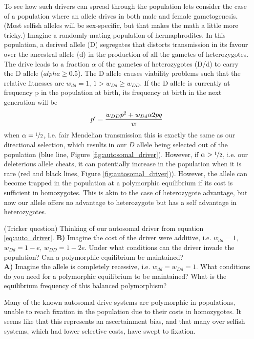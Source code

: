 {To see how such drivers can spread through the population lets
consider the case of a population where an allele drives in both male
and female gametogenesis. (Most selfish alleles will be sex-specific,
but that makes the math a little more tricky.)
Imagine a randomly-mating population of hermaphrodites. In this
population, a derived allele (D) segregates that distorts transmission
in its favour over the ancestral allele (d) in the production of all
the gametes of heterozygotes. The drive leads to a fraction $\alpha$ of the gametes
of heterozygotes (D/d) to carry the D allele ($alpha \geq 0.5$). The D allele
causes viability problems such that the
relative fitnesses are $w_{dd}=1$, $1 > w_{Dd} \geq w_{DD}$. If the D allele
is currently at frequency p in the population at birth, its frequency
at birth in the next generation will be
\begin{equation}
p^{\prime}=\frac{w_{DD}p^2 + w_{Dd} \alpha 2pq  }{\overline{w}} \label{eq:auto_driver}
 \end{equation}
when $\alpha=\nicefrac{1}{2}$, i.e. fair Mendelian transmission this is exactly the same as our directional selection, which results in our $D$
allele being selected out of the population (blue line, Figure \ref{fig:autosomal_driver}). However, if
$\alpha>\nicefrac{1}{2}$, i.e. our deleterious allele cheats, it can potentially
increase in the population when it is rare (red and black lines,
Figure \ref{fig:autosomal_driver})). However, the allele can become
trapped in the population at a polymorphic equilibrium if its cost is
sufficient in homozygotes. This is akin to the case of heterozygote
advantage, but now our allele offers no advantage to heterozygote but
has a self advantage in heterozygotes.

\begin{question} (Tricker question)
  Thinking of our autosomal driver from equation \ref{eq:auto_driver}.
  {\bf B)}	Imagine the cost of the driver were additive, i.e.  $w_{dd}=1$, $w_{Dd}=1-e$, $w_{DD}=1-2e$. Under what conditions can the
driver invade the population? Can a polymorphic equilibrium be maintained?\\
{\bf A)}	Imagine the allele is completely recessive, i.e. $w_{dd}=w_{Dd}=1$. What conditions do you need for a polymorphic equilibrium to be maintained? What is the equilibrium frequency of this balanced polymorphism?\\
\end{question}

Many of the known autosomal drive systems are polymorphic in
populations, unable to reach fixation in the population due to their
costs in homozygotes. It seems like that this represents an
ascertainment bias, and that many over selfish systems, which had
lower selective costs, have swept to
fixation. 

}
